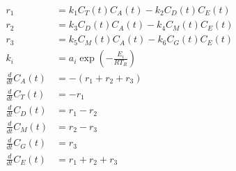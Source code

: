 \begin{equation}
  \begin{aligned}
    r_1                  & = k_1 C_{T}(t) C_{A}(t) - k_2 C_{D}(t) C_{E}(t)
    \\
    r_2                  & = k_3 C_{D}(t) C_{A}(t) - k_4 C_{M}(t) C_{E}(t)
    \\
    r_3                  & = k_5 C_{M}(t) C_{A}(t) - k_6 C_{G}(t) C_{E}(t)
    \\
    k_{i}                & = a_{i} \exp(-\frac{E_{i}}{R T_{R}})
    \\
    \frac{d}{dt}C_{A}(t) & = -(r_{1} + r_{2} + r_{3})
    \\
    \frac{d}{dt}C_{T}(t) & = -r_{1}
    \\
    \frac{d}{dt}C_{D}(t) & = r_{1} - r_{2}
    \\
    \frac{d}{dt}C_{M}(t) & = r_{2} - r_{3}
    \\
    \frac{d}{dt}C_{G}(t) & = r_{3}
    \\
    \frac{d}{dt}C_{E}(t) & = r_{1} + r_{2} + r_{3}
  \end{aligned}
  \label{eq:biodiesel01_1_1}
\end{equation}
